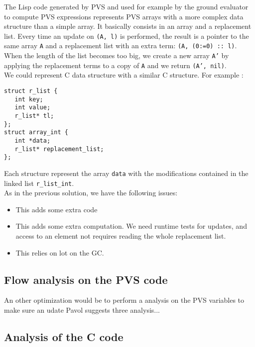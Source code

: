 \documentclass[12pt,a4paper]{article}
\newcommand{\cl}[1]{\texttt{#1}}
\begin{document}
The Lisp code generated by PVS and used for example by the ground evaluator to compute PVS expressions represents PVS arrays with a more complex data structure than a simple array. It basically consists in an array and a replacement list. Every time an update on \cl{(A, l)} is performed, the result is a pointer to the same array \cl{A} and a replacement list with an extra term: \cl{(A, (0:=0) :: l)}. When the length of the list becomes too big, we create a new array \cl{A'} by applying the replacement terms to a copy of \cl{A} and we return \cl{(A', nil)}.\\

We could represent C data structure with a similar C structure. For example :
\begin{lstlisting}
struct r_list {
   int key;
   int value;
   r_list* tl;
};
struct array_int {
   int *data;
   r_list* replacement_list;
};
\end{lstlisting}

Each structure represent the array \cl{data} with the modifications contained in the linked list \cl{r\_list\_int}.\\

As in the previous solution, we have the following issues:
\begin{itemize}
\item This adds some extra code
\item This adds some extra computation. We need runtime tests for updates, and access to an element not requires reading the whole replacement list.
\item This relies on lot on the GC.
\end{itemize}


\subsection{Flow analysis on the PVS code}

An other optimization would be to perform a analysis on the PVS variables to make sure an udate
Pavol \cite{pavol} suggests three analysis...



\subsection{Analysis of the C code}
\label{Canalysis}
\end{document}
